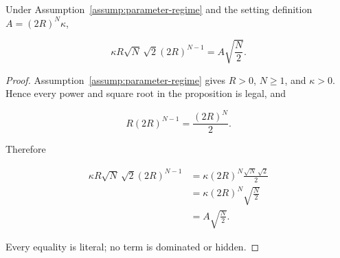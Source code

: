 \begin{lemma}
\label{lem:step-008-s2-literal-algebra}

Under Assumption~\ref{assump:parameter-regime} and the setting definition
\(A=(2R)^N\kappa\),

\begin{equation}
\label{eq:appendix-display-223}
\kappa R\sqrt N\,\sqrt{2}(2R)^{N-1}
=A\sqrt{\frac N2}.
\end{equation}


\end{lemma}

\begin{proof}
Assumption~\ref{assump:parameter-regime} gives \(R>0\), \(N\geq1\), and
\(\kappa>0\). Hence every power and square root in the proposition is legal, and

\begin{equation}
\label{eq:appendix-display-224}
R(2R)^{N-1}=\frac{(2R)^N}{2}.
\end{equation}

Therefore

\begin{equation}
\label{eq:appendix-display-225}
\begin{aligned}
\kappa R\sqrt N\,\sqrt{2}(2R)^{N-1}
&=\kappa(2R)^N\frac{\sqrt N\,\sqrt{2}}{2}\\
&=\kappa(2R)^N\sqrt{\frac N2}\\
&=A\sqrt{\frac N2}.
\end{aligned}
\end{equation}

Every equality is literal; no term is dominated or hidden. 
\end{proof}

